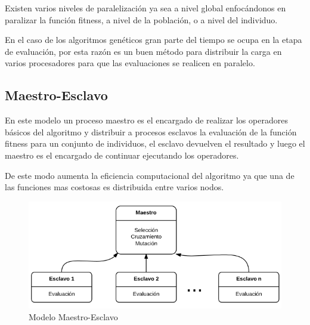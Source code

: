 Existen varios niveles de paralelización ya sea a nivel global enfocándonos en paralizar la función fitness, a nivel de la población, o a nivel del individuo. \citep{Nesmachnow2002}

En el caso de los algoritmos genéticos gran parte del tiempo se ocupa en la etapa de evaluación, por esta razón es un buen método para distribuir la carga en varios procesadores para que las evaluaciones se realicen en paralelo.


\subsection{Maestro-Esclavo}

En este modelo un proceso maestro es el encargado de realizar los operadores básicos del algoritmo y distribuir a procesos esclavos la evaluación de la función fitness para un conjunto de individuos, el esclavo devuelven el resultado y luego el maestro es el encargado de continuar ejecutando los operadores.

De este modo aumenta la eficiencia computacional del algoritmo ya que una de las funciones mas costosas es distribuida entre varios nodos.

\begin{figure}[H]
\centering
\includegraphics[width=0.7\linewidth]{Figures/diagrama-master-slave}
\caption[Modelo Maestro-Esclavo]{Modelo Maestro-Esclavo}
\label{fig:diagrama-master-slave}
\end{figure}

